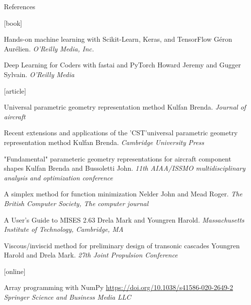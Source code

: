 \begin{frame}[allowframebreaks]{References}

    \begin{thebibliography}{}

        [book]

        Hands-on machine learning with Scikit-Learn, Keras, and TensorFlow
        \newblock G{\'e}ron Aur{\'e}lien.
        \newblock \emph{O'Reilly Media, Inc.}

        Deep Learning for Coders with fastai and PyTorch
        \newblock Howard Jeremy and Gugger Sylvain.
        \newblock \emph{O'Reilly Media}

        [article]

        Universal parametric geometry representation method
        \newblock Kulfan Brenda.
        \newblock \emph{Journal of aircraft}

        Recent extensions and applications of the 'CST'universal parametric geometry representation method
        \newblock Kulfan Brenda.
        \newblock \emph{Cambridge University Press}

        "Fundamental" parameteric geometry representations for aircraft component shapes
        \newblock Kulfan Brenda and Bussoletti John.
        \newblock \emph{11th AIAA/ISSMO multidisciplinary analysis and optimization conference}

        A simplex method for function minimization
        \newblock Nelder John and Mead Roger.
        \newblock \emph{The British Computer Society, The computer journal}

        A User's Guide to MISES 2.63
        \newblock Drela Mark and Youngren Harold.
        \newblock \emph{Massachusetts Institute of Technology, Cambridge, MA}

        Viscous/inviscid method for preliminary design of transonic cascades
        \newblock Youngren Harold and Drela Mark.
        \newblock \emph{27th Joint Propulsion Conference}

        [online]

        Array programming with NumPy
        \newblock \url{https://doi.org/10.1038/s41586-020-2649-2}
        \newblock \emph{Springer Science and Business Media {LLC}}


\end{thebibliography}
\end{frame}
